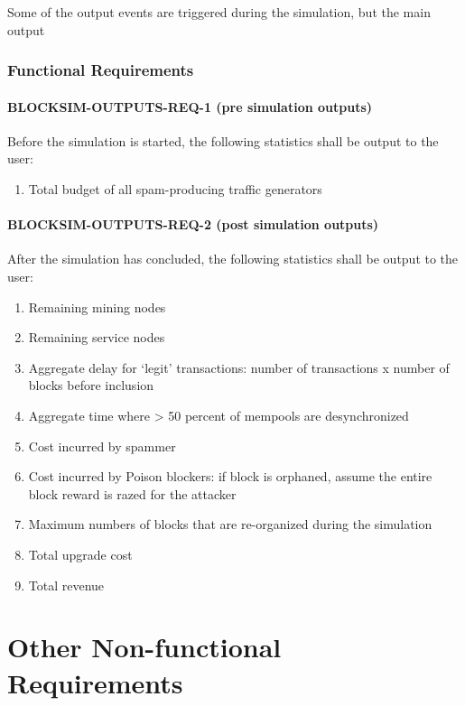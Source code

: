 \documentclass{scrreprt}
\begin{document}
Some of the output events are triggered during the simulation, but the
main output


\subsection{Functional Requirements}


\subsubsection{BLOCKSIM-OUTPUTS-REQ-1 (pre simulation outputs)}

Before the simulation is started, the following statistics shall be output
to the user:

\begin{enumerate}
   \item Total budget of all spam-producing traffic generators
\end{enumerate}


\subsubsection{BLOCKSIM-OUTPUTS-REQ-2 (post simulation outputs)}

After the simulation has concluded, the following statistics shall be output
to the user:

\begin{enumerate}
   \item Remaining mining nodes
   \item Remaining service nodes
   \item Aggregate delay for `legit' transactions: number of transactions x number of blocks before inclusion
   \item Aggregate time where > 50 percent of mempools are desynchronized
   \item Cost incurred by spammer
   \item Cost incurred by Poison blockers: if block is orphaned, assume the entire block reward is razed for the attacker
   \item Maximum numbers of blocks that are re-organized during the simulation
   \item Total upgrade cost
   \item Total revenue
\end{enumerate}


\chapter{Other Non-functional Requirements}
\end{document}
